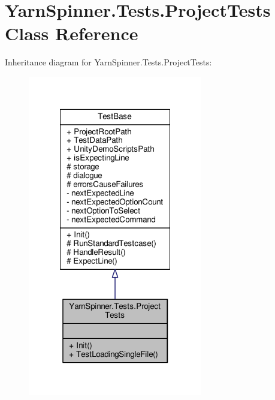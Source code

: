 \hypertarget{a00141}{\section{Yarn\-Spinner.\-Tests.\-Project\-Tests Class Reference}
\label{a00141}
}


Inheritance diagram for Yarn\-Spinner.\-Tests.\-Project\-Tests\-:
\nopagebreak
\begin{figure}[H]
\begin{center}
\leavevmode
\includegraphics[width=216pt]{a00731}
\end{center}
\end{figure}


